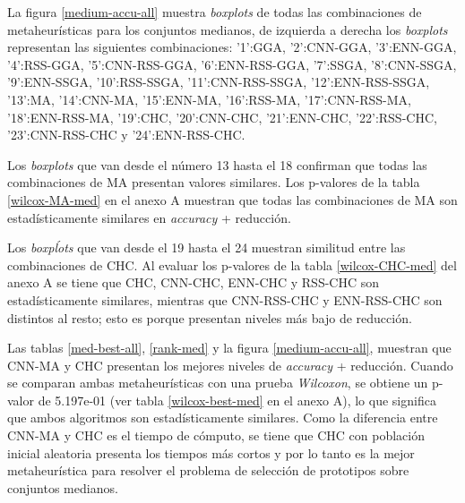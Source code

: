 La figura \ref{medium-accu-all}  muestra \emph{boxplots} de todas las combinaciones de metaheurísticas para los conjuntos medianos, de izquierda a derecha los \emph{boxplots} representan las siguientes combinaciones: '1':GGA, '2':CNN-GGA, '3':ENN-GGA, '4':RSS-GGA, '5':CNN-RSS-GGA, '6':ENN-RSS-GGA, '7':SSGA, '8':CNN-SSGA, '9':ENN-SSGA, '10':RSS-SSGA, '11':CNN-RSS-SSGA, '12':ENN-RSS-SSGA, '13':MA, '14':CNN-MA, '15':ENN-MA, '16':RSS-MA, '17':CNN-RSS-MA, '18':ENN-RSS-MA, '19':CHC, '20':CNN-CHC, '21':ENN-CHC, '22':RSS-CHC, '23':CNN-RSS-CHC y '24':ENN-RSS-CHC.

%
%
%
%

Los \emph{boxplots} que van desde el número 13 hasta el 18 confirman que todas las combinaciones de MA presentan valores similares. Los p-valores de la tabla \ref{wilcox-MA-med} en el anexo A muestran que todas las combinaciones de MA son estadísticamente similares en \emph{accuracy} + reducción.

Los \emph{boxpĺots} que van desde el 19 hasta el 24 muestran similitud entre las combinaciones de CHC. Al evaluar los p-valores de la tabla \ref{wilcox-CHC-med} del anexo A se tiene que CHC, CNN-CHC, ENN-CHC y RSS-CHC son estadísticamente similares, mientras que CNN-RSS-CHC y ENN-RSS-CHC son distintos al resto; esto es porque presentan niveles más bajo de reducción.



Las tablas \ref{med-best-all}, \ref{rank-med} y la figura \ref{medium-accu-all}, muestran que CNN-MA y CHC presentan los mejores niveles de \emph{accuracy} + reducción. Cuando se comparan ambas metaheurísticas con una prueba \emph{Wilcoxon}, se obtiene un p-valor de 5.197e-01 (ver tabla \ref{wilcox-best-med} en el anexo A), lo que significa que ambos algoritmos son estadísticamente similares. Como la diferencia entre CNN-MA y CHC es el tiempo de cómputo, se tiene que CHC con población inicial aleatoria presenta los tiempos más cortos y por lo tanto es la mejor metaheurística para resolver el problema de selección de prototipos sobre conjuntos medianos.


